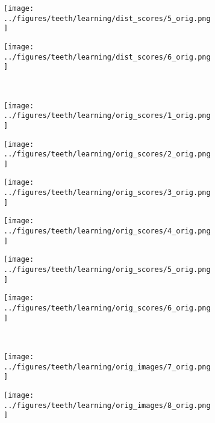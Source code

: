 \begin{figure}[h!]
	\begin{subfigure}{0.16\textwidth}
		\centering
		\texttt{[image: ../figures/teeth/learning/dist\_scores/5\_orig.png]}
		\label{fig:1}
	\end{subfigure}
	\begin{subfigure}{0.16\textwidth}
		\centering
		\texttt{[image: ../figures/teeth/learning/dist\_scores/6\_orig.png]}
		\label{fig:1}
	\end{subfigure}
		\vspace{-0.35cm}
	\\
		\begin{subfigure}{0.16\textwidth}
		\centering
		\texttt{[image: ../figures/teeth/learning/orig\_scores/1\_orig.png]}
		\label{fig:1}
	\end{subfigure}
	\begin{subfigure}{0.16\textwidth}
		\centering
		\texttt{[image: ../figures/teeth/learning/orig\_scores/2\_orig.png]}
		\label{fig:1}
	\end{subfigure}
	\begin{subfigure}{0.16\textwidth}
		\centering
		\texttt{[image: ../figures/teeth/learning/orig\_scores/3\_orig.png]}
		\label{fig:1}
	\end{subfigure}
	\begin{subfigure}{0.16\textwidth}
		\centering
		\texttt{[image: ../figures/teeth/learning/orig\_scores/4\_orig.png]}
		\label{fig:1}
	\end{subfigure}
	\begin{subfigure}{0.16\textwidth}
		\centering
		\texttt{[image: ../figures/teeth/learning/orig\_scores/5\_orig.png]}
		\label{fig:1}
	\end{subfigure}
	\begin{subfigure}{0.16\textwidth}
		\centering
		\texttt{[image: ../figures/teeth/learning/orig\_scores/6\_orig.png]}
		\label{fig:1}
	\end{subfigure}
	\\
		\begin{subfigure}{0.16\textwidth}
		\centering
		\texttt{[image: ../figures/teeth/learning/orig\_images/7\_orig.png]}
		\label{fig:1}
	\end{subfigure}
	\begin{subfigure}{0.16\textwidth}
		\centering
		\texttt{[image: ../figures/teeth/learning/orig\_images/8\_orig.png]}

\end{subfigure}
\end{figure}
